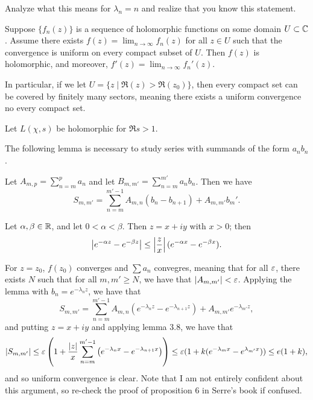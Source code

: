 \begin{exercise}
    Analyze what this means for $\lambda_n = n$ and realize that you know this statement.
\end{exercise}
\begin{lemma}
    Suppose $\{f_n(z)\}$ is a sequence of holomorphic functions on some domain $U \subset \mathbb C$. Assume there exists $f(z) = \lim_{n \to \infty} f_n(z)$ for all $z \in U$ such that the convergence is uniform on every compact subset of $U$. Then $f(z)$ is holomorphic, and moreover, $f'(z) =  \lim_{n \to \infty} f_n'(z)$.
\end{lemma}
\noindent In particular, if we let $U = \{ z \mid \Re(z) > \Re(z_0) \}$, then every compact set can be covered by finitely many sectors, meaning there exists a uniform convergence no every compact set.
\begin{corollary}
    Let $L(\chi, s)$ be holomorphic for $\Re s > 1$.
\end{corollary}
\noindent The following lemma is necessary to study series with summands of the form $a_n b_n$.
\begin{lemma}
    Let $A_{m,p} = \sum_{n=m}^p a_n$ and let $B_{m, m'} = \sum_{n=m}^{m'} a_n b_n$. Then we have
    \[ S_{m, m'} = \sum_{n=m}^{m' - 1} A_{m,n}(b_n - b_{n+1}) + A_{m,m'} b_m'. \]
\end{lemma}
\begin{lemma}
    Let $\alpha, \beta \in \mathbb R$, and let $0 < \alpha < \beta$. Then $z = x + iy$ with $x > 0$; then
    \[ \left\lvert e^{-\alpha z} - e^{-\beta z} \right\rvert \leq \left\lvert \frac{z}{x} \right\rvert (e^{-\alpha x} - e^{-\beta x}). \]
\end{lemma}
\noindent For $z = z_0$, $f(z_0)$ converges and $\sum a_n$ convegres, meaning that for all $\varepsilon$, there exists $N$ such that for all $m, m' \geq N$, we have that $\left\lvert A_{m, m'} \right\rvert < \varepsilon$. Applying the lemma with $b_n = e^{-\lambda_n z}$, we have that
\[ S_{m, m'} = \sum_{n=m}^{m'-1} A_{m,n} (e^{-\lambda_n z} - e^{-\lambda_{n+1} z}) + A_{m,m'} e^{-\lambda_{m'} z}, \]
and putting $z = x + iy$ and applying lemma 3.8, we have that 
\[ \left\lvert S_{m, m'} \right\rvert \leq \varepsilon \left(1 + \frac{\left\lvert z \right\rvert}{x} \sum_{n=m}^{m'-1} \left(e^{-\lambda_n x} - e^{-\lambda_{n+1} x}\right)\right) \leq \varepsilon(1 + k(e^{-\lambda_m x} - e^{\lambda_{m'} x})) \leq e(1 + k), \]
and so uniform convergence is clear. Note that I am not entirely confident about this argument, so re-check the proof of proposition $6$ in Serre's book if confused.